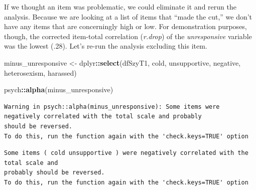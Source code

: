 \documentclass[
  english,
]{book}
\newenvironment{Shaded}{\begin{snugshade}}{\end{snugshade}}
\newcommand{\KeywordTok}[1]{\textcolor[rgb]{0.13,0.29,0.53}{\textbf{#1}}}
\newcommand{\NormalTok}[1]{#1}
\newcommand{\OperatorTok}[1]{\textcolor[rgb]{0.81,0.36,0.00}{\textbf{#1}}}
\newcommand{\StringTok}[1]{\textcolor[rgb]{0.31,0.60,0.02}{#1}}
\begin{document}
If we thought an item was problematic, we could eliminate it and rerun the analysis. Because we are looking at a list of items that ``made the cut,'' we don't have any items that are concerningly high or low. For demonstration purposes, though, the corrected item-total correlation (\emph{r.drop}) of the \emph{unresponsive} variable was the lowest (.28). Let's re-run the analysis excluding this item.

\begin{Shaded}
\begin{Highlighting}[]
\NormalTok{minus_unresponsive <-}\StringTok{ }\NormalTok{dplyr}\OperatorTok{::}\KeywordTok{select}\NormalTok{(dfSzyT1, cold,  unsupportive, negative, heterosexism, harassed)}
\end{Highlighting}
\end{Shaded}

\begin{Shaded}
\begin{Highlighting}[]
\NormalTok{psych}\OperatorTok{::}\KeywordTok{alpha}\NormalTok{(minus_unresponsive) }
\end{Highlighting}
\end{Shaded}

\begin{verbatim}
Warning in psych::alpha(minus_unresponsive): Some items were negatively correlated with the total scale and probably 
should be reversed.  
To do this, run the function again with the 'check.keys=TRUE' option
\end{verbatim}

\begin{verbatim}
Some items ( cold unsupportive ) were negatively correlated with the total scale and 
probably should be reversed.  
To do this, run the function again with the 'check.keys=TRUE' option
\end{verbatim}
\end{document}
